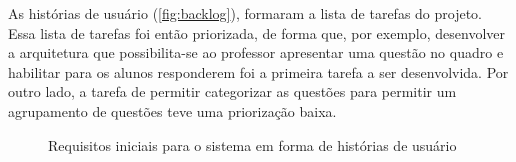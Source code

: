As histórias de usuário (\autoref{fig:backlog}), formaram a lista de tarefas do projeto. Essa
lista de tarefas foi então priorizada, de forma que, por exemplo, desenvolver a arquitetura
que possibilita-se ao professor apresentar uma questão no quadro e habilitar para os alunos
responderem foi a primeira tarefa a ser desenvolvida. Por outro lado, a tarefa de permitir
categorizar as questões para permitir um agrupamento de questões teve uma priorização baixa.

\begin{figure}[!ht]
  \centering

  \caption{Requisitos iniciais para o sistema em forma de histórias de usuário}
  \subfloat{
}
\end{figure}

